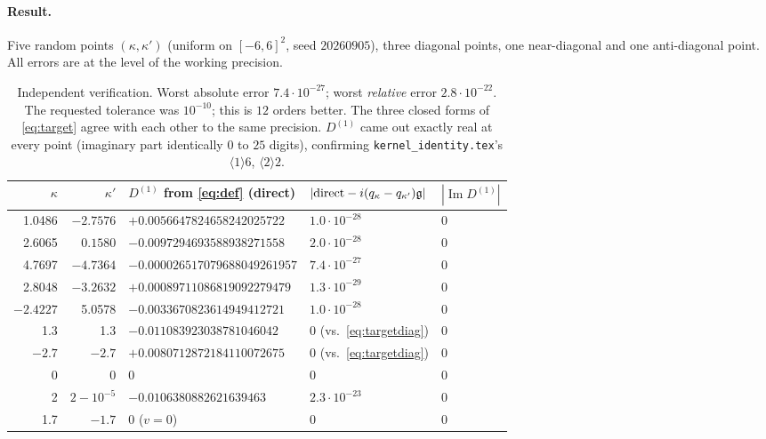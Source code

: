 \documentclass[11pt]{article}
\newcommand{\KI}{\texttt{kernel\_identity.tex}}\newcommand{\NOTE}{\texttt{universality\_normalization.tex}}
\begin{document}
\paragraph{Result.}  Five random points \((\kappa,\kappa')\) (uniform on \([-6,6]^2\), seed
\(20260905\)), three diagonal points, one near-diagonal and one anti-diagonal point.  All errors
are at the level of the working precision.

\begin{table}[h]\centering\footnotesize
\begin{tabular}{rrlll}\toprule
\(\kappa\) & \(\kappa'\) & \(D^{(1)}\) from \eqref{eq:def} (direct) &
\(|{\rm direct}-i(q_\kappa-q_{\kappa'})\mathfrak g|\) & \(|\operatorname{Im}D^{(1)}|\)\\\midrule
 1.0486 & \(-2.7576\) & \(+0.0056647824658242025722\) & \(1.0\cdot10^{-28}\) & \(0\) \\
 2.6065 & \(0.1580\)  & \(-0.0097294693588938271558\) & \(2.0\cdot10^{-28}\) & \(0\) \\
 4.7697 & \(-4.7364\) & \(-0.000026517079688049261957\) & \(7.4\cdot10^{-27}\) & \(0\) \\
 2.8048 & \(-3.2632\) & \(+0.00089711086819092279479\) & \(1.3\cdot10^{-29}\) & \(0\) \\
\(-2.4227\) & 5.0578  & \(-0.0033670823614949412721\) & \(1.0\cdot10^{-28}\) & \(0\) \\\midrule
 1.3 & 1.3   & \(-0.011083923038781046042\) & \(0\) (vs.\ \eqref{eq:targetdiag}) & \(0\)\\
\(-2.7\) & \(-2.7\) & \(+0.0080712872184110072675\) & \(0\) (vs.\ \eqref{eq:targetdiag}) & \(0\)\\
 0 & 0 & \(0\) & \(0\) & \(0\)\\
 2 & \(2-10^{-5}\) & \(-0.0106380882621639463\) & \(2.3\cdot10^{-23}\) & \(0\)\\
 1.7 & \(-1.7\) & \(0\) (\(v=0\)) & \(0\) & \(0\)\\
\bottomrule\end{tabular}
\caption{Independent verification.  Worst absolute error \(7.4\cdot10^{-27}\); worst
\emph{relative} error \(2.8\cdot10^{-22}\).  The requested tolerance was \(10^{-10}\); this is
\(12\) orders better.  The three closed forms of \eqref{eq:target} agree with each other to the
same precision.  \(D^{(1)}\) came out exactly real at every point (imaginary part identically
\(0\) to \(25\) digits), confirming \KI's \(\langle1\rangle6\), \(\langle2\rangle2\).}
\label{tab:v8num}
\end{table}
\end{document}
